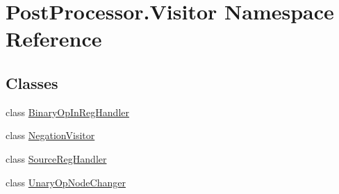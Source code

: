 \hypertarget{namespacePostProcessor_1_1Visitor}{}\section{Post\+Processor.\+Visitor Namespace Reference}
\label{namespacePostProcessor_1_1Visitor}
\subsection*{Classes}
\begin{DoxyCompactItemize}
\item 
class \hyperlink{classPostProcessor_1_1Visitor_1_1BinaryOpInRegHandler}{Binary\+Op\+In\+Reg\+Handler}
\item 
class \hyperlink{classPostProcessor_1_1Visitor_1_1NegationVisitor}{Negation\+Visitor}
\item 
class \hyperlink{classPostProcessor_1_1Visitor_1_1SourceRegHandler}{Source\+Reg\+Handler}
\item 
class \hyperlink{classPostProcessor_1_1Visitor_1_1UnaryOpNodeChanger}{Unary\+Op\+Node\+Changer}
\end{DoxyCompactItemize}
